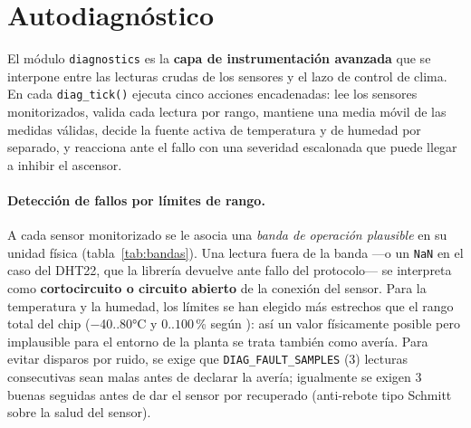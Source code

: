 \section{Autodiagnóstico}
\label{sec:autodiag}

El módulo \texttt{diagnostics} es la \textbf{capa de instrumentación
avanzada} que se interpone entre las lecturas crudas de los sensores y el
lazo de control de clima. En cada \texttt{diag\_tick()} ejecuta cinco
acciones encadenadas: lee los sensores monitorizados, valida cada lectura por
rango, mantiene una media móvil de las medidas válidas, decide la fuente
activa de temperatura y de humedad por separado, y reacciona ante el fallo
con una severidad escalonada que puede llegar a inhibir el ascensor.

\paragraph{Detección de fallos por límites de rango.}
\label{sub:rango}

A cada sensor monitorizado se le asocia una \emph{banda de operación
plausible} en su unidad física (tabla~\ref{tab:bandas}). Una lectura fuera
de la banda ---o un \texttt{NaN} en el caso del DHT22, que la librería
devuelve ante fallo del protocolo--- se interpreta como
\textbf{cortocircuito o circuito abierto} de la conexión del sensor. Para
la temperatura y la humedad, los límites se han elegido más estrechos que
el rango total del chip (−40..80°C y 0..$100$\,\% según
\cite{aosong_dht22}): así un valor físicamente posible pero implausible
para el entorno de la planta se trata también como avería. Para evitar disparos por ruido, se exige que
\texttt{DIAG\_FAULT\_SAMPLES} (3) lecturas consecutivas sean malas antes de
declarar la avería; igualmente se exigen 3 buenas seguidas antes de dar el
sensor por recuperado (anti-rebote tipo Schmitt sobre la salud del sensor).

